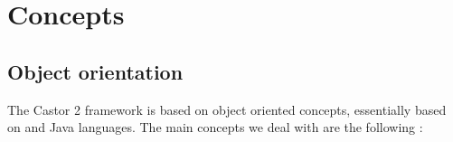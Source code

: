 %
%
%
%
%

\chapter{Concepts}

\section{Object orientation}

The Castor 2 framework is based on object oriented concepts, essentially
based on \cpp and Java languages. The main concepts we deal with are the following :

